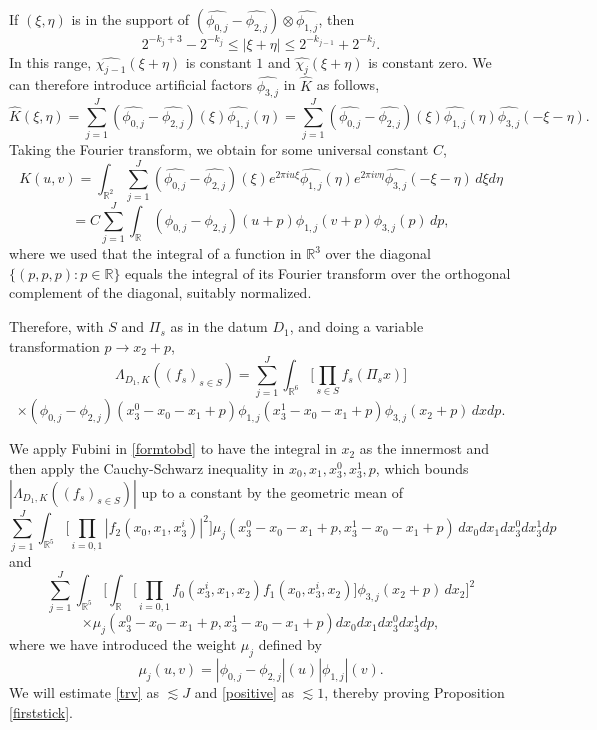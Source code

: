 \documentclass[12pt,reqno]{amsart}
\theoremstyle{plain}
\theoremstyle{definition}
\numberwithin{equation}{section}
\newcommand{\R}{{\mathbb R}}
\begin{document}
If $(\xi,\eta)$ is in the support of $(\widehat{\phi_{0,j}} -\widehat{\phi_{2,j}})\otimes \widehat{\phi_{1,j}}$, then 
\[ 2^{-k_j+3}-2^{-k_j}\leq |\xi+\eta|\leq 2^{-k_{j-1}}+2^{-k_j}. \]
In this range, $\widehat{\chi_{{j-1}}}(\xi+\eta)$ is constant $1$ and
$\widehat{\chi_{{j}}}(\xi+\eta)$ is constant zero. 
We can therefore introduce  artificial factors $\widehat{\phi_{3,j}}$ in $\widehat{K}$ as follows,
\begin{equation*}
 \widehat{K}(\xi,\eta) = \sum_{j=1}^J (\widehat{\phi_{0,j}} -\widehat{\phi_{2,j}})(\xi)  \widehat{\phi_{1,j}}(\eta)  =  \sum_{j=1}^J (\widehat{\phi_{0,j}} -\widehat{\phi_{2,j}})(\xi)  \widehat{\phi_{1,j}}(\eta)\widehat{\phi_{3,j}}(-\xi-\eta). 
\end{equation*} 
Taking the Fourier transform, we obtain for some universal constant $C$,
$$K(u,v)= \int_{\R^2}\sum_{j=1}^J (\widehat{\phi_{0,j}} -\widehat{\phi_{2,j}})(\xi)e^{2\pi i u\xi}  \widehat{\phi_{1,j}}(\eta)e^{2\pi i v\eta}\widehat{\phi_{3,j}}(-\xi-\eta)\, d\xi d\eta$$
\begin{equation}\label{takeft1}=C  \sum_{j=1}^J \int_\R({\phi_{0,j}} -{\phi_{2,j}})(u+p)  {\phi_{1,j}}(v+p){\phi_{3,j}}(p) \,dp,
\end{equation}
where we used that the integral of a function in $\R^3$ over the diagonal
$\{(p,p,p): p\in \R\}$ equals the integral of its Fourier transform over the orthogonal complement of the diagonal, suitably normalized. 

Therefore, with $S$ and $\Pi_s$ as in the datum $D_1$, and doing a variable transformation $p\to x_2+p$,
\[\Lambda_{D_1,K}((f_s)_{s\in S}) =   \sum_{j=1}^J\int_{{\R^6}}  \Big[ \prod_{s\in S}f_s(\Pi_s x) \Big]  \] 
  \begin{equation}
      \label{formtobd}
  \times  ({\phi_{0,j}} -{\phi_{2,j}})(x_3^0-x_0-x_1+p)  {\phi_{1,j}}(x_3^1-x_0-x_1+p)\phi_{3,j} (x_2+p) \,dx dp. 
  \end{equation}



We  apply Fubini  in \eqref{formtobd} to have the integral in $x_2$ as the innermost and then apply  the  Cauchy-Schwarz inequality in $x_0,x_1,x_3^0,x_3^1, p$, which bounds $|\Lambda_{D_1,K}((f_s)_{s\in S})|$ 
up to a constant by  the geometric mean of 
   \begin{equation}
 \sum_{j=1}^J  \int_{\R^5}  \Big[\prod_{i=0,1} |f_2(x_0,x_1,x_3^i)|^2 \Big ]   \mu_j(x_3^0-x_0-x_1+p,x_3^1-x_0-x_1+p) \,  dx_0 dx_1 dx_3^0 dx_3^1 dp
      \label{trv}
 \end{equation}
 and
\[
 \sum_{j=1}^J \int_{\R^5}  \Big[ \int_{\R} \Big[  \prod_{i=0,1} f_0(x_3^i, x_1,x_2) f_1(x_0,x_3^i,x_2)  \Big]
  \phi_{3,j} (x_2+p)\, dx_2 \Big]^2       \]
 \begin{equation}
     \label{positive}
    \times \mu_j(x_3^0-x_0-x_1+p,x_3^1-x_0-x_1+p) dx_0 dx_1 dx_3^0 dx_3^1    dp ,
 \end{equation}
where we have introduced the weight $\mu_j$ defined by
$$\mu_j(u,v)=| {\phi_{0,j}} -{\phi_{2,j}}|(u)  |\phi_{1,j}|(v).$$
We will estimate  \eqref{trv} as $\lesssim J$ and \eqref{positive} as $\lesssim 1$, thereby proving
Proposition \ref{firststick}.
\end{document}
